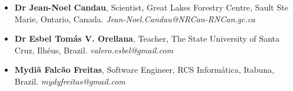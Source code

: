 \documentclass[10pt, a4paper, oneside, final]{scrartcl} %
\begin{document}
\begin{itemize} \itemsep2pt \parskip0pt 
\item \textbf{Dr Jean-Noel Candau}, Scientist, Great Lakes Forestry Centre, Sault Ste Marie, Ontario, Canada. \textit{Jean-Noel.Candau@NRCan-RNCan.gc.ca}

\item \textbf{Dr Esbel Tomás V. Orellana}, Teacher, The State University of Santa Cruz, Ilhéus, Brazil. \textit{valero.esbel@gmail.com} 

\item \textbf{Mydiã Falcão Freitas}, Software Engineer, RCS Informática, Itabuna, Brazil. \textit{mydyfreitas@gmail.com} 
\end{itemize}

\end{document}
